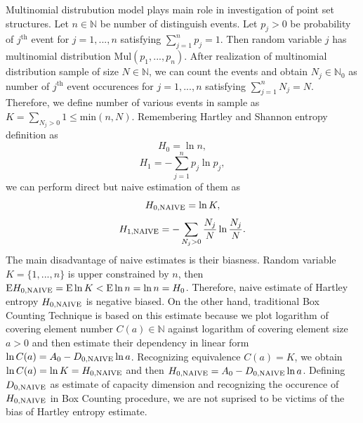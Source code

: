 \documentclass[a4paper,10pt]{article}
\begin{document}
Multinomial distrubution model plays main role in investigation of point set structures. Let $n \in \mathbb{N}$ be number of distinguish events. Let $p_{j} > 0$ be probability of $j^{\text{th}}$ event for $j = 1,...,n$ satisfying $ \sum_{j=1}^{n} p_{j} =1$. Then random variable $j$ has multinomial distribution $\text{Mul}(p_{1},...,p_{n})$. After realization of multinomial distribution sample of size $N \in \mathbb{N}$, we can count the events and obtain $N_{j} \in \mathbb{N}_{0}$ as number of $j^{\text{th}}$ event occurences for $j=1,...,n$ satisfying $\sum_{j=1}^{n} N_{j} = N$. Therefore, we define number of various events in sample as $K = \sum_{N_{j}>0} 1 \le \text{min}(n,N)$. Remembering Hartley and Shannon entropy definition as
\begin{equation} 
\label{eq:hnula}
H_{0}=\ln{n},
\end{equation} 
\begin{equation} 
\label{eq:hjedna}
H_{1}=-\sum_{j=1}^{n} p_{j}\ln{p_{j}},
\end{equation}   
we can perform direct but naive estimation of them as
\begin{equation} 
\label{eq:hnulaap}
H_{0,\mbox{\scriptsize{NAIVE}}}=\ln{K},
\end{equation} 
\begin{equation} 
\label{eq:hjednaap}
H_{1,\mbox{\scriptsize{NAIVE}}}=-\sum_{N_{j}>0} \frac{N_{j}}{N}\ln{\frac{N_{j}}{N}}.
\end{equation}   
The main disadvantage of naive estimates is their biasness. Random variable $K= \{ 1,...,n \} $ is upper constrained by $n$, then $\text{E}H_{0,\mbox{\scriptsize{NAIVE}}} = \text{E}\ln{K} < \text{E}\ln{n} = \ln{n} = H_{0}$. Therefore, naive estimate of Hartley entropy $H_{0,\mbox{\scriptsize{NAIVE}}}$ is negative biased. On the other hand, traditional Box Counting Technique is based on this estimate because we plot logarithm of covering element number $C(a) \in \mathbb{N}$ against logarithm of covering element size $a > 0$ and then estimate their dependency in linear form $\ln{C(a)} = A_{0} - D_{0,\mbox{\scriptsize{NAIVE}}}\ln{a}$. Recognizing equivalence $C(a) = K$, we obtain $\ln{C(a)} = \ln{K} = H_{0,\mbox{\scriptsize{NAIVE}}}$ and then $H_{0,\mbox{\scriptsize{NAIVE}}} = A_{0} - D_{0,\mbox{\scriptsize{NAIVE}}}\ln{a}$. Defining $D_{0,\mbox{\scriptsize{NAIVE}}}$ as estimate of capacity dimension and recognizing the occurence of $H_{0,\mbox{\scriptsize{NAIVE}}}$ in Box Counting procedure, we are not suprised to be victims of the bias of Hartley entropy estimate.\\ 
\end{document}
